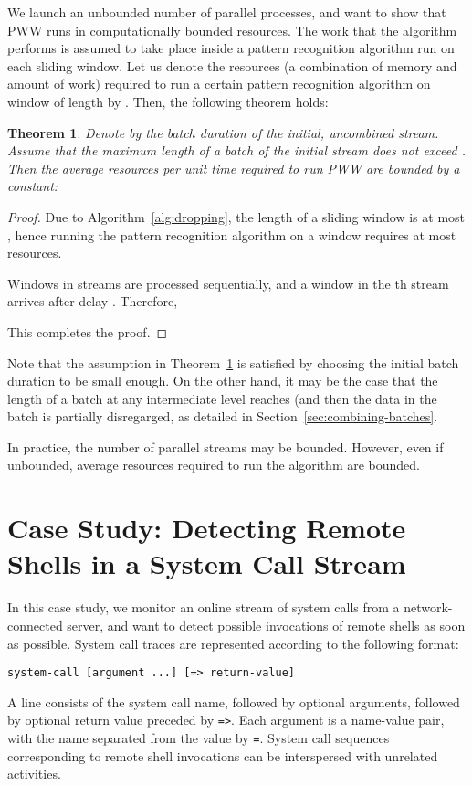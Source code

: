 \documentclass[runningheads,a4paper]{llncs}
\newtheorem{thm}{Theorem}
\begin{document}
We launch an unbounded number of parallel processes, and want to show
that PWW runs in computationally bounded resources. The work that
the algorithm performs is assumed to take place inside a pattern
recognition algorithm run on each sliding window. Let us denote
the resources (a combination of memory and amount of work)
required to run a certain pattern recognition algorithm on
window of length  by . Then, the following
theorem holds:
\begin{thm}
    \label{thm:complexity}
    Denote by  the batch duration of the initial, uncombined
    stream. Assume that the maximum length of a batch of the initial
    stream does not exceed . Then the average resources
     per unit time required to run PWW are bounded by a constant:
    
\end{thm}
\begin{proof}
    Due to Algorithm~\ref{alg:dropping}, the length of a sliding window
	is at most , hence running the pattern recognition
    algorithm on a window requires at most 
    resources.

    Windows in streams are processed sequentially, and a window in the
	th stream arrives after delay . Therefore, 
    
    This completes the proof.
\end{proof}
Note that the assumption in Theorem~\ref{thm:complexity} is 
satisfied by choosing the initial batch duration  to be small
enough. On the other hand, it may be the case that the length
of a batch at any intermediate level reaches  (and
then the data in the batch is partially disregarged, as detailed
in Section~\ref{sec:combining-batches}.

In practice, the number of parallel streams may be bounded.
However, even if unbounded, average resources required to run
the algorithm are bounded.

\section{Case Study: Detecting Remote Shells in a System Call Stream}
\label{sec:case-studies}

In this case study, we monitor an online stream of system calls 
from a network-connected server, and want to detect possible
invocations of remote shells as soon as possible.
System call traces are represented according to the following format:
\begin{verbatim}
system-call [argument ...] [=> return-value]
\end{verbatim}
A line consists of the system call name, followed by optional
arguments, followed by optional return value preceded by
\texttt{=>}.  Each argument is a name-value pair, with the name
separated from the value by \texttt{=}.  System call sequences
corresponding to remote shell invocations can be interspersed
with unrelated activities.
\end{document}
